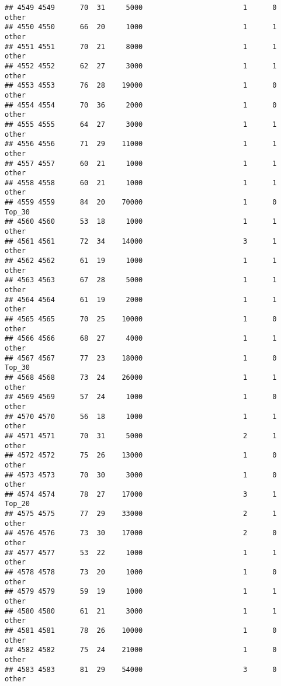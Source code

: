 \documentclass[
]{article}
\begin{document}
\begin{verbatim}
## 4549 4549      70  31     5000                        1      0    other
## 4550 4550      66  20     1000                        1      1    other
## 4551 4551      70  21     8000                        1      1    other
## 4552 4552      62  27     3000                        1      1    other
## 4553 4553      76  28    19000                        1      0    other
## 4554 4554      70  36     2000                        1      0    other
## 4555 4555      64  27     3000                        1      1    other
## 4556 4556      71  29    11000                        1      1    other
## 4557 4557      60  21     1000                        1      1    other
## 4558 4558      60  21     1000                        1      1    other
## 4559 4559      84  20    70000                        1      0   Top_30
## 4560 4560      53  18     1000                        1      1    other
## 4561 4561      72  34    14000                        3      1    other
## 4562 4562      61  19     1000                        1      1    other
## 4563 4563      67  28     5000                        1      1    other
## 4564 4564      61  19     2000                        1      1    other
## 4565 4565      70  25    10000                        1      0    other
## 4566 4566      68  27     4000                        1      1    other
## 4567 4567      77  23    18000                        1      0   Top_30
## 4568 4568      73  24    26000                        1      1    other
## 4569 4569      57  24     1000                        1      0    other
## 4570 4570      56  18     1000                        1      1    other
## 4571 4571      70  31     5000                        2      1    other
## 4572 4572      75  26    13000                        1      0    other
## 4573 4573      70  30     3000                        1      0    other
## 4574 4574      78  27    17000                        3      1   Top_20
## 4575 4575      77  29    33000                        2      1    other
## 4576 4576      73  30    17000                        2      0    other
## 4577 4577      53  22     1000                        1      1    other
## 4578 4578      73  20     1000                        1      0    other
## 4579 4579      59  19     1000                        1      1    other
## 4580 4580      61  21     3000                        1      1    other
## 4581 4581      78  26    10000                        1      0    other
## 4582 4582      75  24    21000                        1      0    other
## 4583 4583      81  29    54000                        3      0    other

\end{verbatim}
\end{document}
